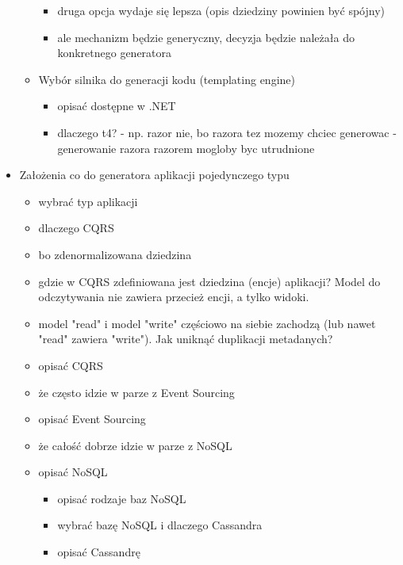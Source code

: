 \begin{itemize}
\begin{itemize}
\begin{itemize}
\begin{itemize}
      \end{itemize}
     \item druga opcja wydaje się lepsza (opis dziedziny powinien być spójny)
     \item ale mechanizm będzie generyczny, decyzja będzie należała do konkretnego generatora
    \end{itemize}
   \item Wybór silnika do generacji kodu (templating engine)
    \begin{itemize}
     \item opisać dostępne w .NET
     \item dlaczego t4? - np. razor nie, bo razora tez mozemy chciec generowac - generowanie razora razorem mogloby byc utrudnione
    \end{itemize}
  \end{itemize}

  \item Założenia co do generatora aplikacji pojedynczego typu
   \begin{itemize}
    \item wybrać typ aplikacji
    \item dlaczego CQRS
     \item bo zdenormalizowana dziedzina
     \item gdzie w CQRS zdefiniowana jest dziedzina (encje) aplikacji? Model do odczytywania nie zawiera przecież encji, a tylko widoki.
     \item model "read" i model "write" częściowo na siebie zachodzą (lub nawet "read" zawiera "write"). Jak uniknąć duplikacji metadanych?
    \item opisać CQRS
    \item że często idzie w parze z Event Sourcing
    \item opisać Event Sourcing
    \item że całość dobrze idzie w parze z NoSQL
    \item opisać NoSQL
     \begin{itemize}
      \item opisać rodzaje baz NoSQL
      \item wybrać bazę NoSQL i dlaczego Cassandra
      \item opisać Cassandrę
     \end{itemize}
   \end{itemize}
  

\end{itemize}
